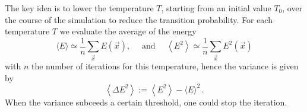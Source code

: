 The key idea is to lower the temperature $T$, starting from an initial value $T_0$, over the course of the simulation to reduce the transition probability.
For each temperature $T$ we evaluate the average of the energy
$$\langle E\rangle \simeq \frac{1}{n} \sum_{\vec{x}} E(\vec{x}), \quad \text { and } \quad\left\langle E^2\right\rangle \simeq \frac{1}{n} \sum_{\vec{x}} E^2(\vec{x})$$
with $n$ the number of iterations for this temperature, hence the variance is given by
$$\left\langle\Delta E^2\right\rangle:=\left\langle E^2\right\rangle-\langle E\rangle^2 \,.$$
When the variance subceeds a certain threshold, one could stop the iteration.
